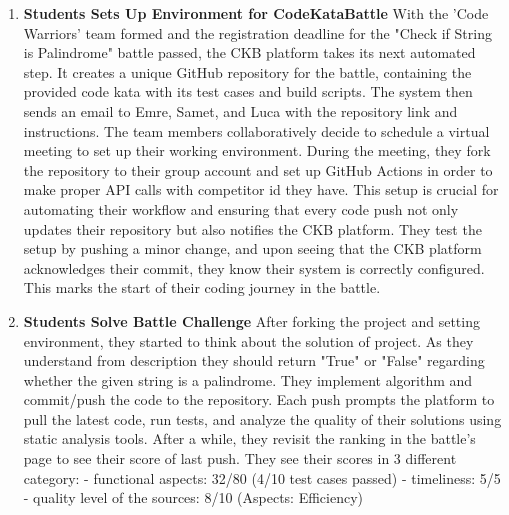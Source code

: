 \begin{enumerate}
    \item \textbf{Students Sets Up Environment for CodeKataBattle} \newline With the 'Code Warriors' team formed and the registration deadline for the "Check if String is Palindrome" battle passed, the CKB platform takes its next automated step. It creates a unique GitHub repository for the battle, containing the provided code kata with its test cases and build scripts. The system then sends an email to Emre, Samet, and Luca with the repository link and instructions. The team members collaboratively decide to schedule a virtual meeting to set up their working environment. During the meeting, they fork the repository to their group account and set up GitHub Actions in order to make proper API calls with competitor id they have. This setup is crucial for automating their workflow and ensuring that every code push not only updates their repository but also notifies the CKB platform. They test the setup by pushing a minor change, and upon seeing that the CKB platform acknowledges their commit, they know their system is correctly configured. This marks the start of their coding journey in the battle.
    \item \textbf{Students Solve Battle Challenge} \newline After forking the project and setting environment, they started to think about the solution of project. As they understand from description they should return "True" or "False" regarding whether the given string is a palindrome. They implement algorithm and commit/push the code to the repository. Each push prompts the platform to pull the latest code, run tests, and analyze the quality of their solutions using static analysis tools. After a while, they revisit the ranking in the battle's page to see their score of last push. They see their scores in 3 different category: \newline
    - functional aspects: 32/80 (4/10 test cases passed) \newline
    - timeliness: 5/5 \newline
    - quality level of the sources: 8/10 (Aspects: Efficiency) \newline

\end{enumerate}
